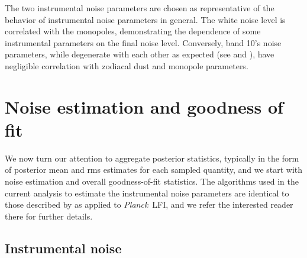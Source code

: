 \documentclass{aa}
\def\Planck{\textit{Planck}}
\begin{document}
The two instrumental noise parameters are chosen as representative of the behavior of instrumental noise parameters in general. The white noise level is correlated with the monopoles, demonstrating the dependence of some instrumental parameters on the final noise level. Conversely, band 10's noise parameters, while degenerate with each other as expected (see \citealt{bp04} and \citealt{bp06}), have negligible correlation with zodiacal dust and monopole parameters.




\section{Noise estimation and goodness of fit}
\label{sec:noise_gof}

We now turn our attention to aggregate posterior statistics, typically
in the form of posterior mean and rms estimates for each sampled
quantity, and we start with noise estimation and overall
goodness-of-fit statistics. The algorithms used in the current
analysis to estimate the instrumental noise parameters are identical
to those described by \citet{bp06} as applied to \Planck\ LFI, and we
refer the interested reader there for further details.

\subsection{Instrumental noise}
\end{document}
